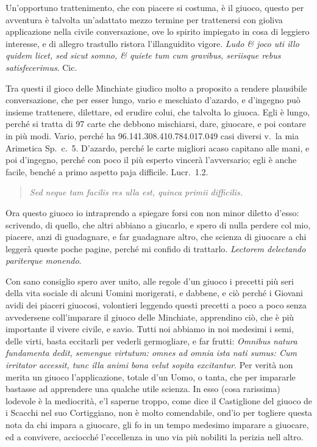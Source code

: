 \documentclass[11pt,a6paper]{article}
\newcommand{\literaryquote}[1]{%
\kern -6pt  \begin{verse}
    {\footnotesize \it #1}
  \end{verse}\kern -2pt%
}
\begin{document}
Un'opportuno trattenimento, che con
piacere si costuma, è il giuoco, questo per
avventura è talvolta un'adattato mezzo
termine per trattenersi con gioliva applicazione
nella civile conversazione, ove lo spirito
impiegato in cosa di leggiero interesse, e di
allegro trastullo ristora l'illanguidito vigore.
\textit{Ludo \& joco uti illo quidem licet, sed sicut
 somno, \& quiete tum cum gravibus, seriisque
 rebus satisfecerimus}. Cic.

Tra questi il gioco delle Minchiate giudico
molto a proposito a rendere plausibile
conversazione, che per esser lungo, vario
e meschiato d'azardo, e d'ingegno può insieme
trattenere, dilettare, ed erudire colui,
che talvolta lo giuoca. Egli è lungo,
perché si tratta di 97 carte che debbono mischiarsi,
dare, giuocare, e poi contare in più
modi. Vario, perché ha 96.141.308.410.784.017.049
casi diversi v.\ la mia Arimetica
Sp.\ c.\ 5. D'azardo, perché le carte migliori
acaso capitano alle mani, e poi d'ingegno,
perché con poco il più esperto vincerà l'avversario;
egli è anche facile, benché a primo
aspetto paja difficile. Lucr.\ 1.2.
\literaryquote{
 Sed neque tam facilis res ulla est, quinca primii difficilis.}

Ora questo giuoco io intraprendo a spiegare
forsi con non minor diletto d'esso: scrivendo,
di quello, che altri abbiano a giucarlo,
e spero di nulla perdere col mio, piacere,
anzi di guadagnare, e far guadagnare
altro, che scienza di giuocare a chi leggerà
queste poche pagine, perché mi confido di
trattarlo. \textit{Lectorem delectando pariterque
 monendo}.

Con sano consiglio spero aver unito, alle
regole d'un giuoco i precetti più seri della
vita sociale di alcuni Uomini morigerati, e
dabbene, e ciò perché i Giovani avidi dei
piaceri giuocosi, volontieri leggendo questi
precetti a poco a poco senza avvedersene
coll'imparare il giuoco delle Minchiate,
apprendino ciò, che è più importante il vivere
civile, e savio. Tutti noi abbiamo in noi
medesimi i semi, delle virti, basta eccitarli
per vederli germogliare, e far frutti: \textit{
 Omnibus natura fundamenta dedit, semengue
virtutum: omnes ad omnia ista nati sumus:
Cum irritator accessit, tunc illa animi bona
velut sopita excitantur}. Per verità non
merita un giuoco l'applicazione, totale d'un
Uomo, o tanta, che per impararle bastasse ad
apprendere una qualche utile scienza. In esso
(cosa rarissima) lodevole è la mediocrità,
e'l saperne troppo, come dice il Castiglione
del giuoco de i Scacchi nel suo Cortiggiano,
non è molto comendabile, ond'io per togliere
questa nota da chi impara a giuocare, gli fo
in un tempo medesimo imparare a giuocare,
ed a convivere, acciocché l'eccellenza in uno
via più nobiliti la perizia nell altro.
\end{document}
